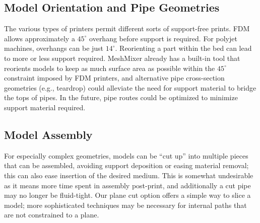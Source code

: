{\subsection{Model Orientation and Pipe Geometries}
The various types of printers permit different sorts of support-free prints.  FDM allows approximately a $45^\circ$ overhang before support is required.  For polyjet machines, overhangs can be just $14^\circ$.  Reorienting a part within the bed can lead to more or less support required.  MeshMixer already has a built-in tool that reorients models to keep as much surface area as possible within the $45^\circ$ constraint imposed by FDM printers, and alternative pipe cross-section geometries (e.g., teardrop) could alleviate the need for support material to bridge the tops of pipes.  In the future, pipe routes could be optimized to minimize support material required.

\subsection{Model Assembly}
For especially complex geometries, models can be ``cut up'' into multiple pieces that can be assembled, avoiding support deposition or easing material removal; this can also ease insertion of the desired medium. This is somewhat undesirable as it means more time spent in assembly post-print, and additionally a cut pipe may no longer be fluid-tight.  
Our plane cut option offers a simple way to slice a model; more sophisticated techniques may be necessary for internal paths that are not constrained to a plane.
}